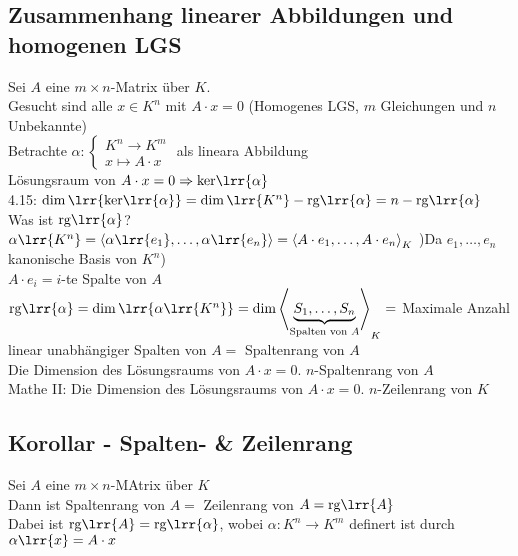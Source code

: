 \subsection{Zusammenhang linearer Abbildungen und homogenen LGS}
	Sei $A$ eine $m\times n$-Matrix über $K$.\\
	Gesucht sind alle $x\in K^n$ mit $A\cdot x=0$ (Homogenes LGS, $m$ Gleichungen und $n$ Unbekannte)\\
	Betrachte $\alpha:\begin{cases}K^n\rightarrow K^m\\x\mapsto A\cdot x\end{cases}$ als lineara Abbildung\\
	Lösungsraum von $A\cdot x=0 \Rightarrow \mbox{ker}\lrr{\alpha}$\\
	4.15: $\dim\lrr{\mbox{ker}\lrr{\alpha}}=\dim\lrr{K^n}-\mbox{rg}\lrr{\alpha}=n-\mbox{rg}\lrr{\alpha}$\\
	Was ist $\mbox{rg}\lrr{\alpha}$?\\
	$\alpha\lrr{K^n}=\left\langle\alpha\lrr{e_1},\dots,\alpha\lrr{e_n}\right\rangle=\left\langle A\cdot e_1,\dots, A\cdot e_n\right\rangle_K$ )Da $e_1,\dots,e_n$ kanonische Basis von $K^n$)\\
	$A\cdot e_i=i$-te Spalte von $A$\\
	$\mbox{rg}\lrr{\alpha}=\dim\lrr{\alpha\lrr{K^n}}=\dim\left\langle \underbrace{S_1,\dots,S_n}_{\mbox{\scriptsize Spalten von }\scriptstyle A}\right\rangle_K=$ Maximale Anzahl linear unabhängiger Spalten von $A =$ Spaltenrang von $A$\\
	Die Dimension des Lösungsraums von $A\cdot x=0$. $n$-Spaltenrang von $A$\\
	Mathe II: Die Dimension des Lösungsraums von $A\cdot x=0$. $n$-Zeilenrang von $K$
	
\subsection{Korollar - Spalten- \& Zeilenrang}
	Sei $A$ eine $m\times n$-MAtrix über $K$\\
	Dann ist Spaltenrang von $A =$ Zeilenrang von $A=\mbox{rg}\lrr{A}$\\
	Dabei ist $\mbox{rg}\lrr{A}=\mbox{rg}\lrr{\alpha}$, wobei $\alpha:K^n\rightarrow K^m$ definert ist durch $\alpha\lrr{x}=A\cdot x$

